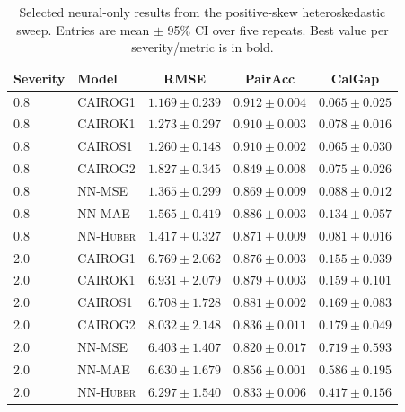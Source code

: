 \begin{table}[t]
\centering
\small
\caption{Selected neural-only results from the positive-skew heteroskedastic sweep. Entries are mean $\pm$ 95\% CI over five repeats. Best value per severity/metric is in bold.}
\label{tab:positive-skew-selected}
\begin{tabular}{l l c c c}
\toprule
Severity & Model & RMSE & PairAcc & CalGap \\
\midrule
0.8 & \textsc{CAIROG1} & $\mathbf{1.169 \pm 0.239}$ & $\mathbf{0.912 \pm 0.004}$ & $0.065 \pm 0.025$ \\
0.8 & \textsc{CAIROK1} & $1.273 \pm 0.297$ & $0.910 \pm 0.003$ & $0.078 \pm 0.016$ \\
0.8 & \textsc{CAIROS1} & $1.260 \pm 0.148$ & $0.910 \pm 0.002$ & $\mathbf{0.065 \pm 0.030}$ \\
0.8 & \textsc{CAIROG2} & $1.827 \pm 0.345$ & $0.849 \pm 0.008$ & $0.075 \pm 0.026$ \\
0.8 & \textsc{NN-MSE} & $1.365 \pm 0.299$ & $0.869 \pm 0.009$ & $0.088 \pm 0.012$ \\
0.8 & \textsc{NN-MAE} & $1.565 \pm 0.419$ & $0.886 \pm 0.003$ & $0.134 \pm 0.057$ \\
0.8 & \textsc{NN-Huber} & $1.417 \pm 0.327$ & $0.871 \pm 0.009$ & $0.081 \pm 0.016$ \\
\midrule
2.0 & \textsc{CAIROG1} & $6.769 \pm 2.062$ & $0.876 \pm 0.003$ & $\mathbf{0.155 \pm 0.039}$ \\
2.0 & \textsc{CAIROK1} & $6.931 \pm 2.079$ & $0.879 \pm 0.003$ & $0.159 \pm 0.101$ \\
2.0 & \textsc{CAIROS1} & $6.708 \pm 1.728$ & $\mathbf{0.881 \pm 0.002}$ & $0.169 \pm 0.083$ \\
2.0 & \textsc{CAIROG2} & $8.032 \pm 2.148$ & $0.836 \pm 0.011$ & $0.179 \pm 0.049$ \\
2.0 & \textsc{NN-MSE} & $6.403 \pm 1.407$ & $0.820 \pm 0.017$ & $0.719 \pm 0.593$ \\
2.0 & \textsc{NN-MAE} & $6.630 \pm 1.679$ & $0.856 \pm 0.001$ & $0.586 \pm 0.195$ \\
2.0 & \textsc{NN-Huber} & $\mathbf{6.297 \pm 1.540}$ & $0.833 \pm 0.006$ & $0.417 \pm 0.156$ \\
\bottomrule
\end{tabular}
\end{table}

